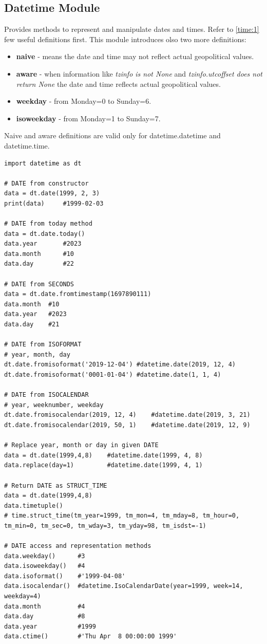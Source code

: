 \documentclass{article}
\begin{document}
\subsection{Datetime Module}
Provides methods to represent and manipulate dates and times. Refer to \ref{time:1} few useful definitions first. This module introduces olso two more definitions:
\begin{itemize}
\item \textbf{naive} - means the date and time may not reflect actual geopolitical values.
\item \textbf{aware} - when information like \textit{tzinfo is not None} and \textit{tzinfo.utcoffset does not return None} the date and time reflects actual geopolitical values. 
\item \textbf{weekday} - from Monday=0 to Sunday=6.
\item \textbf{isoweekday} - from Monday=1 to Sunday=7.
\end{itemize}
Naive and aware definitions are valid only for datetime.datetime and datetime.time.

\begin{lstlisting}[style=pystyle] 
import datetime as dt

# DATE from constructor
data = dt.date(1999, 2, 3)
print(data)		#1999-02-03

# DATE from today method
data = dt.date.today()
data.year		#2023
data.month		#10
data.day		#22

# DATE from SECONDS
data = dt.date.fromtimestamp(1697890111) 
data.month	#10
data.year	#2023
data.day	#21

# DATE from ISOFORMAT
# year, month, day
dt.date.fromisoformat('2019-12-04')	#datetime.date(2019, 12, 4)
dt.date.fromisoformat('0001-01-04')	#datetime.date(1, 1, 4)

# DATE from ISOCALENDAR
# year, weeknumber, weekday
dt.date.fromisocalendar(2019, 12, 4)	#datetime.date(2019, 3, 21)
dt.date.fromisocalendar(2019, 50, 1)	#datetime.date(2019, 12, 9)

# Replace year, month or day in given DATE
data = dt.date(1999,4,8)	#datetime.date(1999, 4, 8)
data.replace(day=1)			#datetime.date(1999, 4, 1)

# Return DATE as STRUCT_TIME
data = dt.date(1999,4,8)
data.timetuple()
# time.struct_time(tm_year=1999, tm_mon=4, tm_mday=8, tm_hour=0, tm_min=0, tm_sec=0, tm_wday=3, tm_yday=98, tm_isdst=-1)

# DATE access and representation methods
data.weekday()		#3
data.isoweekday()	#4
data.isoformat()	#'1999-04-08'
data.isocalendar()	#datetime.IsoCalendarDate(year=1999, week=14, weekday=4)
data.month			#4
data.day			#8
data.year			#1999
data.ctime()		#'Thu Apr  8 00:00:00 1999'




\end{lstlisting}
\end{document}
